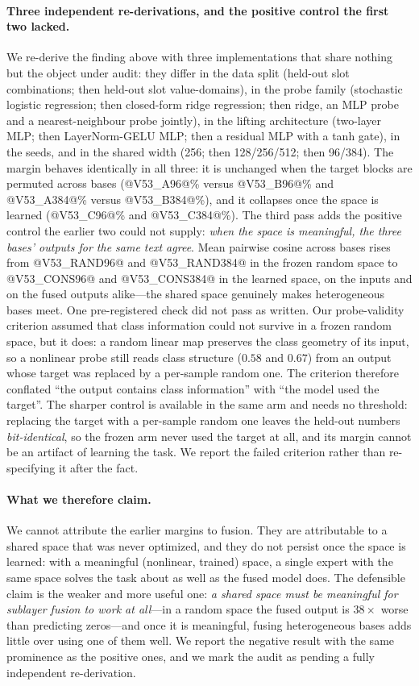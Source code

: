 \paragraph{Three independent re-derivations, and the positive control the first two lacked.} We re-derive the finding above with three implementations that share nothing but the object under audit: they differ in the data split (held-out slot combinations; then held-out slot value-domains), in the probe family (stochastic logistic regression; then closed-form ridge regression; then ridge, an MLP probe and a nearest-neighbour probe jointly), in the lifting architecture (two-layer MLP; then LayerNorm-GELU MLP; then a residual MLP with a tanh gate), in the seeds, and in the shared width (256; then 128/256/512; then 96/384). The margin behaves identically in all three: it is unchanged when the target blocks are permuted across bases (@V53_A96@\% versus @V53_B96@\% and @V53_A384@\% versus @V53_B384@\%), and it collapses once the space is learned (@V53_C96@\% and @V53_C384@\%). The third pass adds the positive control the earlier two could not supply: \emph{when the space is meaningful, the three bases' outputs for the same text agree}. Mean pairwise cosine across bases rises from @V53_RAND96@ and @V53_RAND384@ in the frozen random space to @V53_CONS96@ and @V53_CONS384@ in the learned space, on the inputs and on the fused outputs alike---the shared space genuinely makes heterogeneous bases meet. One pre-registered check did not pass as written. Our probe-validity criterion assumed that class information could not survive in a frozen random space, but it does: a random linear map preserves the class geometry of its input, so a nonlinear probe still reads class structure ($0.58$ and $0.67$) from an output whose target was replaced by a per-sample random one. The criterion therefore conflated ``the output contains class information'' with ``the model used the target''. The sharper control is available in the same arm and needs no threshold: replacing the target with a per-sample random one leaves the held-out numbers \emph{bit-identical}, so the frozen arm never used the target at all, and its margin cannot be an artifact of learning the task. We report the failed criterion rather than re-specifying it after the fact.


\paragraph{What we therefore claim.}
We cannot attribute the earlier margins to fusion. They are attributable to a shared space that
was never optimized, and they do not persist once the space is learned: with a meaningful
(nonlinear, trained) space, a single expert with the same space solves the task about as well as
the fused model does. The defensible claim is the weaker and more useful one: \emph{a shared space
must be meaningful for sublayer fusion to work at all}---in a random space the fused output is
$38\times$ worse than predicting zeros---and once it is meaningful, fusing heterogeneous bases
adds little over using one of them well. We report the negative result with the same prominence
as the positive ones, and we mark the audit as pending a fully independent re-derivation.
